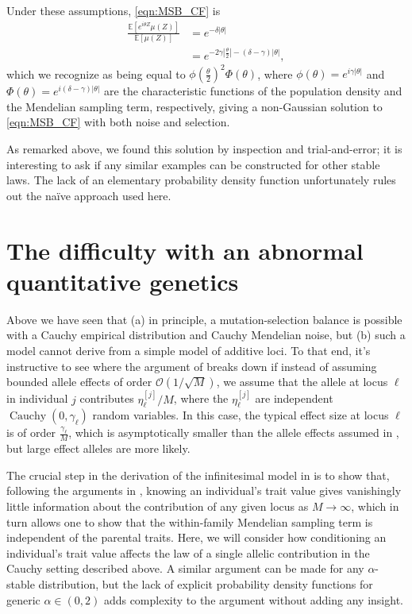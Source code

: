\documentclass{article}
\newcommand{\1}{\mathbbm{1}}
\newcommand{\Oh}{{\mathcal O}}
\DeclareMathOperator*{\Cauchy}{Cauchy}
\theoremstyle{remark}
\theoremstyle{definition}
\begin{document}
Under these assumptions, \eqref{eqn:MSB_CF} is
\begin{align*}
	\frac{\mathbb{E}\left[e^{i \theta Z}\mu(Z)\right]}{\mathbb{E}[\mu(Z)]} 
	&= e^{-\delta |\theta|}\\
	&= e^{-2\gamma \left|\frac{\theta}{2}\right|-(\delta-\gamma)|\theta|},
\end{align*} 
which we recognize as being equal to $\phi\left(\frac{\theta}{2}\right)^{2} \Phi(\theta)$, where $\phi(\theta) = e^{i\gamma|\theta|}$ and $\Phi(\theta) = e^{i(\delta - \gamma)|\theta|}$ are the characteristic functions of the population density and the Mendelian sampling term, respectively,
giving a non-Gaussian solution to \eqref{eqn:MSB_CF} with both noise and selection.

As remarked above, we found this solution by inspection and trial-and-error; it is interesting to ask if any similar examples can be constructed for other stable laws.  The lack of an elementary probability density function unfortunately rules out the na\"ive approach used here. 


\section{The difficulty with an abnormal quantitative genetics}
    \label{sec:difficulty}

Above we have seen that
(a) in principle,
a mutation-selection balance is possible with a Cauchy empirical distribution and Cauchy Mendelian noise,
but (b)
such a model cannot derive from a simple model of additive loci.
To that end, it's instructive to see where the argument of \cite{barton2017infinitesimal} breaks down
if instead of assuming bounded allele effects of order $\Oh(1/\sqrt{M})$,
we assume that the allele at locus $\ell$ in individual $j$ contributes
$\eta^{[j]}_{\ell}/M$, where the $\eta^{[j]}_{\ell}$ are independent $\Cauchy(0,\gamma_{\ell})$ random variables. 
In this case, the typical effect size at locus $\ell$ is of order $\frac{\gamma_{\ell}}{M}$,
which is asymptotically smaller than the allele effects assumed in \cite{barton2017infinitesimal},
but large effect alleles are more likely. 

The crucial step in the derivation of the infinitesimal model in \cite{barton2017infinitesimal} is to show that, 
following the arguments in \citet{fisher1918correlation}, knowing an individual's trait value gives vanishingly little information about the contribution of any given locus as $M \to \infty$, which in turn allows one to show that the within-family Mendelian sampling term is independent of the parental traits. Here, we will consider how conditioning an individual's trait value affects the law of a single allelic contribution in the Cauchy setting described above. A similar argument can be made for any $\alpha$-stable distribution, but the lack of explicit probability density functions for generic $\alpha \in (0,2)$ adds complexity to the argument without adding any insight. 
\end{document}
